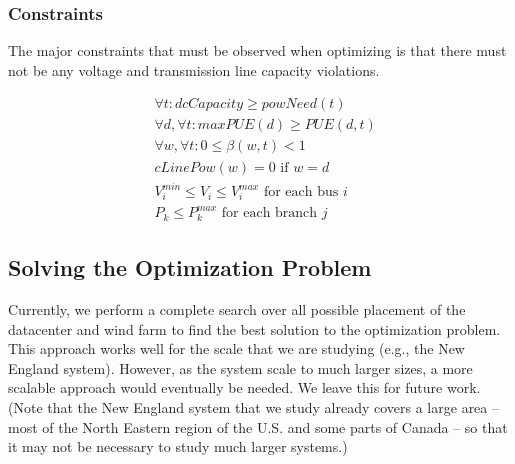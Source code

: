 

\subsubsection{Constraints}
The major constraints that must be observed when optimizing is that there must not be any voltage and transmission line capacity violations.


\begin{figure}[ht]
{\scriptsize
\begin{eqnarray}
&\forall t :  \textit{dcCapacity} \geq \textit{powNeed}(t)\\
&\forall d, \forall t: \textit{maxPUE}(d) \geq \textit{PUE}(d,t)\\
&\forall w, \forall t: 0 \leq \beta(w,t) < 1\\
&\textit{cLinePow}(w)=0 \text{ if } w=d\\
&V^{min}_i  \leq  V_i \leq V^{max}_i \text{ for each bus $i$ }\\
&P_k \leq P^{max}_k \text{ for each branch $j$ }
\end{eqnarray}
}
\caption{}
\label{fig:constraints}
\vspace{-0.2in}
\end{figure}

\subsection{Solving the Optimization Problem}

Currently, we perform a complete search over all possible placement of the datacenter and wind farm to find the best solution to the optimization problem.  This approach works well for the scale that we are studying (e.g., the New England system).  However, as the system scale to much larger sizes, a more scalable approach would eventually be needed.  We leave this for future work.  (Note that the New England system that we study already covers a large area -- most of the North Eastern region of the U.S. and some parts of Canada -- so that it may not be necessary to study much larger systems.)

